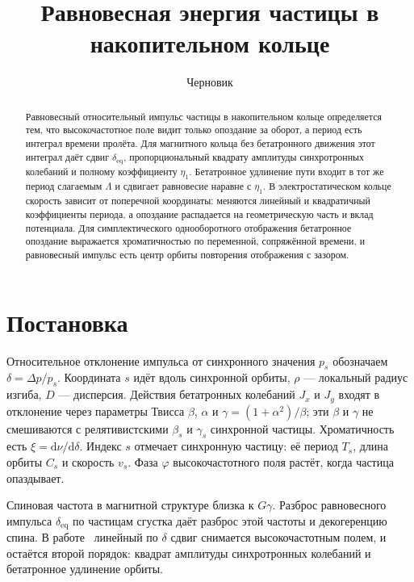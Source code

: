 \documentclass[aps,pra,preprint,a4paper,amsmath,amssymb,longbibliography]{revtex4-2}
\begin{document}
\title{Равновесная энергия частицы в накопительном кольце}
\author{Черновик}

\begin{abstract}
Равновесный относительный импульс частицы в накопительном кольце определяется тем, что высокочастотное поле видит только опоздание за оборот, а период есть интеграл времени пролёта. Для магнитного кольца без бетатронного движения этот интеграл даёт сдвиг $\delta_{\mathrm{eq}}$, пропорциональный квадрату амплитуды синхротронных колебаний и полному коэффициенту $\eta_1$. Бетатронное удлинение пути входит в тот же период слагаемым $\Lambda$ и сдвигает равновесие наравне с $\eta_1$. В электростатическом кольце скорость зависит от поперечной координаты: меняются линейный и квадратичный коэффициенты периода, а опоздание распадается на геометрическую часть и вклад потенциала. Для симплектического однооборотного отображения бетатронное опоздание выражается хроматичностью по переменной, сопряжённой времени, и равновесный импульс есть центр орбиты повторения отображения с зазором.
\end{abstract}

\maketitle

\section{Постановка}
\label{sec:setup}

Относительное отклонение импульса от синхронного значения $p_s$ обозначаем $\delta=\Delta p/p_s$. Координата $s$ идёт вдоль синхронной орбиты, $\rho$ --- локальный радиус изгиба, $D$ --- дисперсия. Действия бетатронных колебаний $J_x$ и $J_y$ входят в отклонение через параметры Твисса $\beta$, $\alpha$ и $\gamma=(1+\alpha^2)/\beta$; эти $\beta$ и $\gamma$ не смешиваются с релятивистскими $\beta_s$ и $\gamma_s$ синхронной частицы. Хроматичность есть $\xi=\mathrm{d}\nu/\mathrm{d}\delta$. Индекс $s$ отмечает синхронную частицу: её период $T_s$, длина орбиты $C_s$ и скорость $v_s$. Фаза $\varphi$ высокочастотного поля растёт, когда частица опаздывает.

Спиновая частота в магнитной структуре близка к $G\gamma$. Разброс равновесного импульса $\delta_{\mathrm{eq}}$ по частицам сгустка даёт разброс этой частоты и декогеренцию спина. В работе~\cite{Senichev2013} линейный по $\delta$ сдвиг снимается высокочастотным полем, и остаётся второй порядок: квадрат амплитуды синхротронных колебаний и бетатронное удлинение орбиты.
\end{document}
